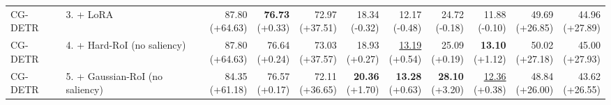 \documentclass{article}
\begin{document}
{\begin{tabular}{llrrrrrrrrr}
CG-DETR & 3. + LoRA & \shortstack{87.80 \\ {\scriptsize (+64.63)}} & \shortstack{\textbf{76.73} \\ {\scriptsize (+0.33)}} & \shortstack{72.97 \\ {\scriptsize (+37.51)}} & \shortstack{18.34 \\ {\scriptsize (-0.32)}} & \shortstack{12.17 \\ {\scriptsize (-0.48)}} & \shortstack{24.72 \\ {\scriptsize (-0.18)}} & \shortstack{11.88 \\ {\scriptsize (-0.10)}} & \shortstack{49.69 \\ {\scriptsize (+26.85)}} & \shortstack{44.96 \\ {\scriptsize (+27.89)}} \\
CG-DETR & 4. + Hard-RoI (no saliency) & \shortstack{87.80 \\ {\scriptsize (+64.63)}} & \shortstack{76.64 \\ {\scriptsize (+0.24)}} & \shortstack{73.03 \\ {\scriptsize (+37.57)}} & \shortstack{18.93 \\ {\scriptsize (+0.27)}} & \shortstack{\underline{13.19} \\ {\scriptsize (+0.54)}} & \shortstack{25.09 \\ {\scriptsize (+0.19)}} & \shortstack{\textbf{13.10} \\ {\scriptsize (+1.12)}} & \shortstack{50.02 \\ {\scriptsize (+27.18)}} & \shortstack{45.00 \\ {\scriptsize (+27.93)}} \\
CG-DETR & 5. + Gaussian-RoI (no saliency) & \shortstack{84.35 \\ {\scriptsize (+61.18)}} & \shortstack{76.57 \\ {\scriptsize (+0.17)}} & \shortstack{72.11 \\ {\scriptsize (+36.65)}} & \shortstack{\textbf{20.36} \\ {\scriptsize (+1.70)}} & \shortstack{\textbf{13.28} \\ {\scriptsize (+0.63)}} & \shortstack{\textbf{28.10} \\ {\scriptsize (+3.20)}} & \shortstack{\underline{12.36} \\ {\scriptsize (+0.38)}} & \shortstack{48.84 \\ {\scriptsize (+26.00)}} & \shortstack{43.62 \\ {\scriptsize (+26.55)}} \\

\end{tabular}}
\end{document}
